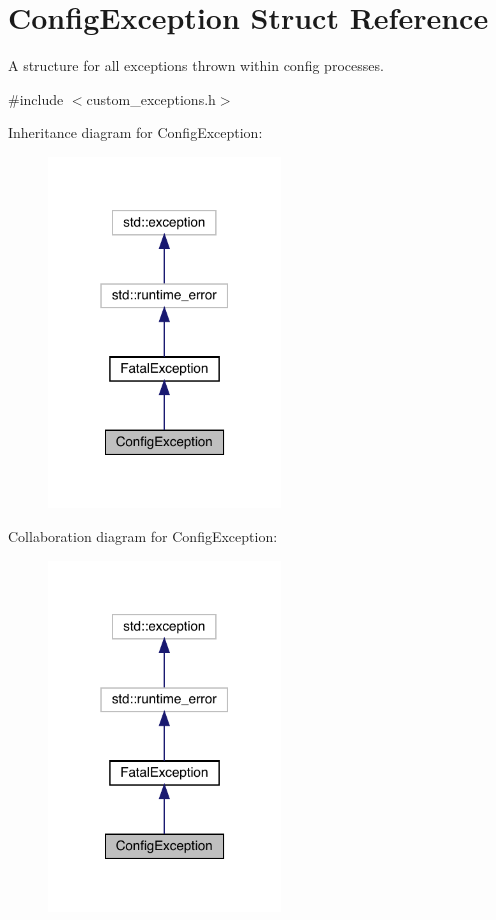 \hypertarget{struct_config_exception}{}\section{Config\+Exception Struct Reference}
\label{struct_config_exception}


A structure for all exceptions thrown within config processes.  




{\ttfamily \#include $<$custom\+\_\+exceptions.\+h$>$}



Inheritance diagram for Config\+Exception\+:
\nopagebreak
\begin{figure}[H]
\begin{center}
\leavevmode
\includegraphics[width=175pt]{struct_config_exception__inherit__graph}
\end{center}
\end{figure}


Collaboration diagram for Config\+Exception\+:
\nopagebreak
\begin{figure}[H]
\begin{center}
\leavevmode
\includegraphics[width=175pt]{struct_config_exception__coll__graph}
\end{center}
\end{figure}

